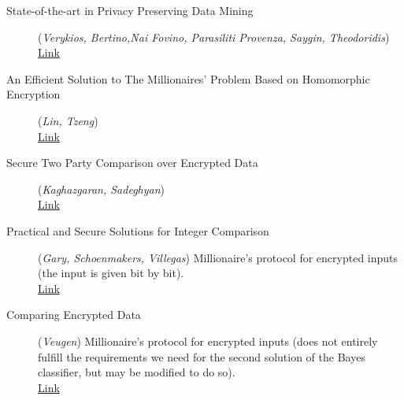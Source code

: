 \documentclass[11pt]{article}
\begin{document}
\begin{description}
	\item [State-of-the-art in Privacy Preserving Data Mining](\emph{Verykios, Bertino,Nai Fovino, Parasiliti Provenza, Saygin, Theodoridis})
	\\ \href{http://www.sigmod.org/publications/sigmod-record/0403/B1.bertion-sigmod-record2.pdf}{Link}
	
	\item [An Efficient Solution to The Millionaires' Problem Based on Homomorphic Encryption](\emph{Lin, Tzeng})
	\\ \href{http://eprint.iacr.org/2005/043.pdf}{Link}
	                
	\item [Secure Two Party Comparison over Encrypted Data](\emph{Kaghazgaran, Sadeghyan})
	\\ \href{http://ieeexplore.ieee.org/stamp/stamp.jsp?tp=&arnumber=6141405&tag=1}{Link} 
	
	\item [Practical and Secure Solutions for Integer Comparison](\emph{Gary, Schoenmakers, Villegas})
	Millionaire's protocol for encrypted inputs (the input is given bit by bit).
	\\ \href{http://www.win.tue.nl/~berry/papers/pkc07intcomp.pdf}{Link}   
	
	                                                                                             
	\item [Comparing Encrypted Data](\emph{Veugen})
 	Millionaire's protocol for encrypted inputs (does not entirely fulfill the requirements we need for the second solution of the Bayes classifier, but may be modified to do so).   
	\\ \href{http://msp.ewi.tudelft.nl/sites/default/files/Comparing%20encrypted%20data.pdf}{Link}
\end{description}





\newpage





\end{document}

